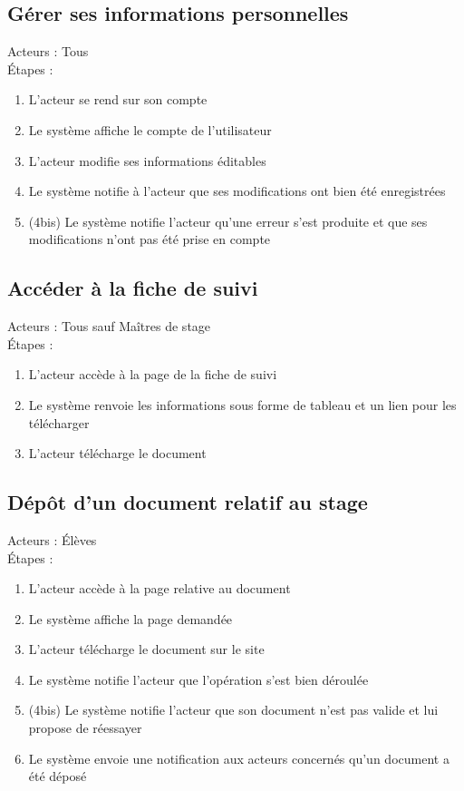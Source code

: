 \documentclass{scrreprt}
\begin{document}
\subsection{Gérer ses informations personnelles}
Acteurs : Tous 
\\
\'Etapes : 
\begin{enumerate}
\item L’acteur se rend sur son compte
\item Le syst\`eme affiche le compte de l’utilisateur 
\item L’acteur modifie ses informations \'editables
\item Le syst\`eme notifie \`a l’acteur que ses modifications ont bien \'et\'e enregistr\'ees
\item (4bis) Le système notifie l’acteur qu’une erreur s’est produite et que ses modifications n’ont pas été prise en compte
\end{enumerate}
\subsection{Acc\'eder \`a la fiche de suivi}
Acteurs : Tous sauf Ma\^itres de stage
\\
\'Etapes : 
\begin{enumerate}
\item L’acteur acc\`ede \`a la page de la fiche de suivi
\item Le syst\`eme renvoie les informations sous forme de tableau et un lien pour les t\'el\'echarger
\item L’acteur t\'el\'echarge le document
\end{enumerate}
\subsection{D\'ep\^ot d'un document relatif au stage}
Acteurs : \'El\`eves 
\\
\'Etapes : 
\begin{enumerate}
\item L’acteur acc\`ede \`a la page relative au document
\item Le syst\`eme affiche la page demand\'ee
\item L’acteur t\'el\'echarge le document sur le site
\item Le syst\`eme notifie l’acteur que l’op\'eration s’est bien d\'eroul\'ee 
\item (4bis) Le syst\`eme notifie l’acteur que son document n’est pas valide et lui propose de r\'eessayer
\item Le syst\`eme envoie une notification aux acteurs concern\'es qu’un document a \'et\'e d\'epos\'e
\end{enumerate}
\end{document}
